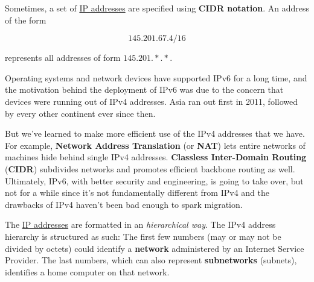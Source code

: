 \documentclass{article}
\newcounter{definition}[section]
\newcounter{example}[section]
\begin{document}
    \begin{definition}
      \label{def:cidr-notation}
      Sometimes, a set of \hyperref[def:ip-addresses]{IP addresses} are specified using \textbf{CIDR notation}. An address of the form 

        \begin{equation}
          145.201.67.4/16
        \end{equation}

      represents all addresses of form $145.201.\ast.\ast$. 
    \end{definition}

    Operating systems and network devices have supported IPv6 for a long time, and the motivation behind the deployment of IPv6 was due to the concern that devices were running out of IPv4 addresses. Asia ran out first in 2011, followed by every other continent ever since then. 

    But we've learned to make more efficient use of the IPv4 addresses that we have. For example, \textbf{Network Address Translation} (or \textbf{NAT}) lets entire networks of machines hide behind single IPv4 addresses. \textbf{Classless Inter-Domain Routing} (\textbf{CIDR}) subdivides networks and promotes efficient backbone routing as well. Ultimately, IPv6, with better security and engineering, is going to take over, but not for a while since it's not fundamentally different from IPv4 and the drawbacks of IPv4 haven't been bad enough to spark migration. 

    \begin{definition}
      \label{def:hierarchy-of-ip-addresses-2}
 
      The \hyperref[def:ip-addresses]{IP addresses} are formatted in an \textit{hierarchical way}. The IPv4 address hierarchy is structured as such: The first few numbers (may or may not be divided by octets) could identify a \textbf{network} administered by an Internet Service Provider. The last numbers, which can also represent \textbf{subnetworks} (subnets), identifies a home computer on that network. 
    \end{definition}
\end{document}
